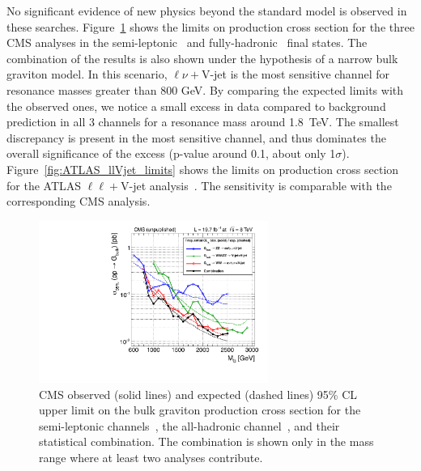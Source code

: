 \documentclass[3p,times,twocolumn]{elsarticle}
\begin{document}
No significant evidence of new physics beyond the 
standard model is observed in these searches.
Figure~\ref{fig:CMS_VV_limits} shows the limits on production cross section for the
three CMS analyses in the semi-leptonic~\cite{Khachatryan:2014gha} and
fully-hadronic~\cite{Khachatryan:2014hpa} final states. 
The combination of the results is also shown under the
hypothesis of a narrow bulk graviton model. In this scenario, $\ell\nu
+$V-jet is the most sensitive channel for resonance masses greater
than 800 GeV. By comparing the expected limits with the observed ones,
we notice a small excess in data compared to background
prediction in all 3 channels for a resonance mass around 1.8~TeV. 
The smallest discrepancy is present in the most sensitive channel, 
and thus dominates the overall significance of the excess 
(p-value around 0.1, about only 1$\sigma$).
Figure~\ref{fig:ATLAS_llVjet_limits} shows the limits on production cross section for the 
ATLAS $\ell\ell+$V-jet analysis~\cite{Aad:2014xka}. The sensitivity is comparable with
the corresponding CMS analysis. 

\begin{figure}[htbp]
\centering
\includegraphics[width=7.5cm]{CMS_VV_limits.pdf}
\caption{CMS observed (solid lines) and expected (dashed lines) 95\% CL upper limit on the bulk graviton production cross section for the semi-leptonic channels~\cite{Khachatryan:2014gha}, the all-hadronic channel~\cite{Khachatryan:2014hpa}, and their statistical combination. The combination is shown only in the mass range where at least two analyses contribute.}
\label{fig:CMS_VV_limits}
\end{figure}
\end{document}
